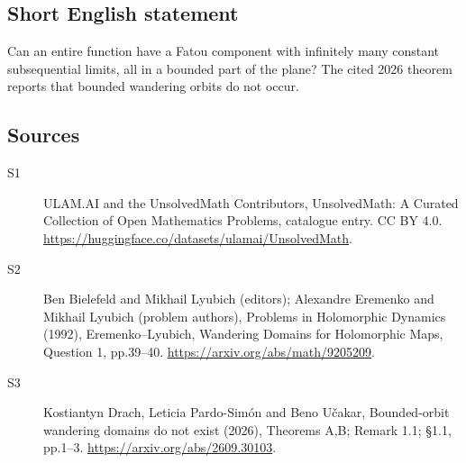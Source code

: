 \documentclass[11pt]{article}
\begin{document}
\subsection{Short English statement}
Can an entire function have a Fatou component with infinitely many constant subsequential limits, all in a bounded part of the plane? The cited 2026 theorem reports that bounded wandering orbits do not occur.
\subsection{Sources}
\begin{description}
\item[\hypertarget{source:statement:1}{S1}] ULAM.AI and the UnsolvedMath Contributors, UnsolvedMath: A Curated Collection of Open Mathematics Problems, catalogue entry. CC BY 4.0. \url{https://huggingface.co/datasets/ulamai/UnsolvedMath}.
\item[\hypertarget{source:statement:2}{S2}] Ben Bielefeld and Mikhail Lyubich (editors); Alexandre Eremenko and Mikhail Lyubich (problem authors), Problems in Holomorphic Dynamics (1992), Eremenko–Lyubich, Wandering Domains for Holomorphic Maps, Question 1, pp.39–40. \url{https://arxiv.org/abs/math/9205209}.
\item[\hypertarget{source:statement:3}{S3}] Kostiantyn Drach, Leticia Pardo-Simón and Beno Učakar, Bounded-orbit wandering domains do not exist (2026), Theorems A,B; Remark 1.1; §1.1, pp.1–3. \url{https://arxiv.org/abs/2609.30103}.
\end{description}
\label{end:statement}
\end{document}
